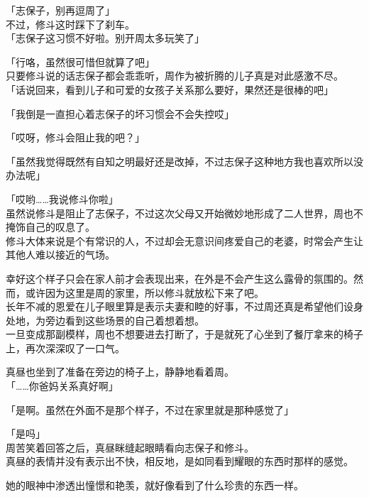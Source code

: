 「志保子，别再逗周了」\\

不过，修斗这时踩下了刹车。\\

「志保子这习惯不好啦。别开周太多玩笑了」

「行咯，虽然很可惜但就算了吧」\\

只要修斗说的话志保子都会乖乖听，周作为被折腾的儿子真是对此感激不尽。\\

「话说回来，看到儿子和可爱的女孩子关系那么要好，果然还是很棒的吧」

「我倒是一直担心着志保子的坏习惯会不会失控哎」

「哎呀，修斗会阻止我的吧？」

「虽然我觉得既然有自知之明最好还是改掉，不过志保子这种地方我也喜欢所以没办法呢」

「哎哟……我说修斗你啦」\\

虽然说修斗是阻止了志保子，不过这次父母又开始微妙地形成了二人世界，周也不掩饰自己的叹息了。\\

修斗大体来说是个有常识的人，不过却会无意识间疼爱自己的老婆，时常会产生让其他人难以接近的气场。

幸好这个样子只会在家人前才会表现出来，在外是不会产生这么露骨的氛围的。然而，或许因为这里是周的家里，所以修斗就放松下来了吧。\\

长年不减的恩爱在儿子眼里算是表示夫妻和睦的好事，不过周还真是希望他们设身处地，为旁边看到这些场景的自己着想着想。\\

一旦变成那副模样，周也不想要进去打断了，于是就死了心坐到了餐厅拿来的椅子上，再次深深叹了一口气。

真昼也坐到了准备在旁边的椅子上，静静地看着周。\\

「……你爸妈关系真好啊」

「是啊。虽然在外面不是那个样子，不过在家里就是那种感觉了」

「是吗」\\

周苦笑着回答之后，真昼眯缝起眼睛看向志保子和修斗。\\

真昼的表情并没有表示出不快，相反地，是如同看到耀眼的东西时那样的感觉。

她的眼神中渗透出憧憬和艳羡，就好像看到了什么珍贵的东西一样。\\

